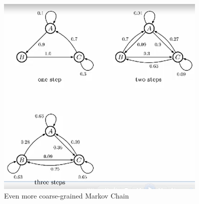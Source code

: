 \documentclass[]{article}
\begin{document}
\begin{figure}[H]
	\caption{Even more coarse-grained Markov Chain}\label{fig:markov3}
	\includegraphics[width=0.9\textwidth]{markov3}
\end{figure}
\end{document}
